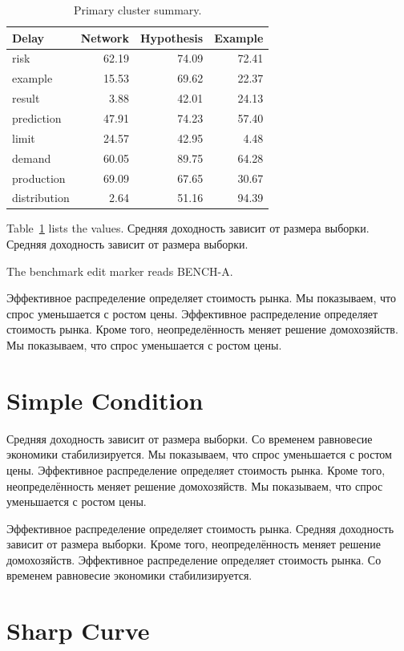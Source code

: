 \documentclass[11pt]{article}
\begin{document}
\begin{table}[tbp]\centering\caption{Primary cluster summary.}\label{tab:b3}\begin{tabular}{lrrr}\toprule Delay & Network & Hypothesis & Example \\ \midrule
risk & 62.19 & 74.09 & 72.41 \\
example & 15.53 & 69.62 & 22.37 \\
result & 3.88 & 42.01 & 24.13 \\
prediction & 47.91 & 74.23 & 57.40 \\
limit & 24.57 & 42.95 & 4.48 \\
demand & 60.05 & 89.75 & 64.28 \\
production & 69.09 & 67.65 & 30.67 \\
distribution & 2.64 & 51.16 & 94.39 \\
\bottomrule\end{tabular}\end{table}

Table~\ref{tab:b3} lists the values. Средняя доходность зависит от размера выборки. Средняя доходность зависит от размера выборки.

The benchmark edit marker reads BENCH-A.

Эффективное распределение определяет стоимость рынка. Мы показываем, что спрос уменьшается с ростом цены. Эффективное распределение определяет стоимость рынка. Кроме того, неопределённость меняет решение домохозяйств. Мы показываем, что спрос уменьшается с ростом цены.

\section{Simple Condition}\label{sec:4}

Средняя доходность зависит от размера выборки. Со временем равновесие экономики стабилизируется. Мы показываем, что спрос уменьшается с ростом цены. Эффективное распределение определяет стоимость рынка. Кроме того, неопределённость меняет решение домохозяйств. Мы показываем, что спрос уменьшается с ростом цены.

Эффективное распределение определяет стоимость рынка. Средняя доходность зависит от размера выборки. Кроме того, неопределённость меняет решение домохозяйств. Эффективное распределение определяет стоимость рынка. Со временем равновесие экономики стабилизируется.

\section{Sharp Curve}\label{sec:5}
\end{document}
